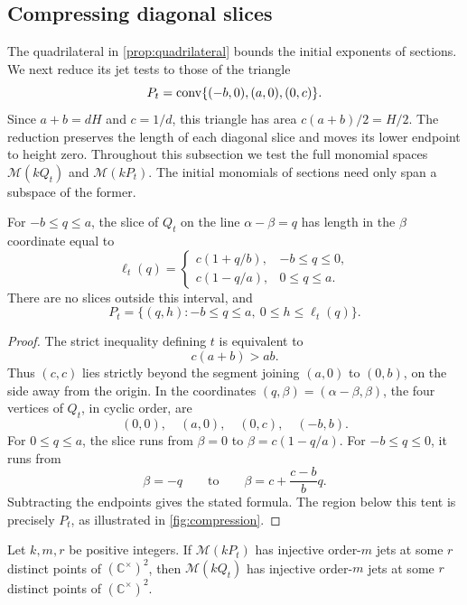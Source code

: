 \subsection{Compressing diagonal slices}\label{subsec:sec-compression}

The quadrilateral in \cref{prop:quadrilateral} bounds the initial exponents of sections.  We next reduce its jet tests to those of the triangle
\[
 P_t=\operatorname{conv}\{(-b,0),(a,0),(0,c)\}.
\]
Since $a+b=dH$ and $c=1/d$, this triangle has area $c(a+b)/2=H/2$. The reduction preserves the length of each diagonal slice and moves its lower endpoint to height zero.  Throughout this subsection we test the full monomial spaces $\mathcal{M}(kQ_t)$ and $\mathcal{M}(kP_t)$.  The initial monomials of sections need only span a subspace of the former.

\begin{lemma}\label{lem:slices}
For $-b\le q\le a$, the slice of $Q_t$ on the line $\alpha-\beta=q$ has length in the $\beta$ coordinate equal to
\[
 \ell_t(q)=
 \begin{cases}
 c(1+q/b),&-b\le q\le0,\\[2pt]
 c(1-q/a),&0\le q\le a.
 \end{cases}
\]
There are no slices outside this interval, and
\[
 P_t=\{(q,h):-b\le q\le a,\ 0\le h\le\ell_t(q)\}.
\]
\end{lemma}

\begin{proof}
The strict inequality defining $t$ is equivalent to
\[
 c(a+b)>ab.
\]
Thus $(c,c)$ lies strictly beyond the segment joining $(a,0)$ to $(0,b)$, on the side away from the origin.  In the coordinates $(q,\beta)=(\alpha-\beta,\beta)$, the four vertices of $Q_t$, in cyclic order, are
\[
 (0,0),\quad (a,0),\quad (0,c),\quad (-b,b).
\]
For $0\le q\le a$, the slice runs from $\beta=0$ to $\beta=c(1-q/a)$.  For $-b\le q\le0$, it runs from
\[
 \beta=-q
 \qquad\text{to}\qquad
 \beta=c+\frac{c-b}{b}q.
\]
Subtracting the endpoints gives the stated formula.  The region below this tent is precisely $P_t$, as illustrated in \cref{fig:compression}.
\end{proof}




\begin{proposition}\label{prop:compression}
Let $k,m,r$ be positive integers.  If $\mathcal{M}(kP_t)$ has injective order-$m$ jets at some $r$ distinct points of $(\mathbb{C}^\times)^2$, then $\mathcal{M}(kQ_t)$ has injective order-$m$ jets at some $r$ distinct points of $(\mathbb{C}^\times)^2$.
\end{proposition}

